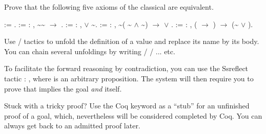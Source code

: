 \begin{exercise} \label{ex:equivax} 


Prove that the following five axioms of the classical are equivalent.


\begin{coqdoccode}
\coqdocemptyline
\coqdocnoindent
{}  := .\coqdoceol
\coqdocnoindent
{}  := \coqdockw{\ensuremath{\forall}} : , \textasciitilde \textasciitilde {} \ensuremath{\rightarrow} .\coqdoceol
\coqdocnoindent
{}  := \coqdockw{\ensuremath{\forall}} : ,  \ensuremath{\lor} \textasciitilde{}.\coqdoceol
\coqdocnoindent
{}  := \coqdockw{\ensuremath{\forall}}  : , \textasciitilde ( \textasciitilde{} \ensuremath{\land} \textasciitilde{}) \ensuremath{\rightarrow}  \ensuremath{\lor} .\coqdoceol
\coqdocnoindent
{}  := \coqdockw{\ensuremath{\forall}}  : , ( \ensuremath{\rightarrow} ) \ensuremath{\rightarrow} (\~{} \ensuremath{\lor} ).\coqdoceol
\coqdocemptyline
\coqdocemptyline
\end{coqdoccode}


\hint Use  /  tactics to unfold the
 definition of a value  and replace its name by its body. You can
 chain several unfoldings by writing  / / ...
 etc. 


\hint To facilitate the forward reasoning by contradiction, you can
 use the Ssreflect tactic : ,  where  is
 an arbitrary proposition. The system will then require you to prove
 that  implies the goal \textit{and}  itself.




\hint Stuck with a tricky proof? Use the Coq  keyword as a
 ``stub'' for an unfinished proof of a goal, which, nevertheless will be
 considered completed by Coq. You can always get back to an admitted
 proof later.


\end{exercise}




